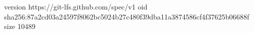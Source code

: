 version https://git-lfs.github.com/spec/v1
oid sha256:87a2cd03a24597f8062bc5024b27c480f39dba11a3874586cf4f37625b06688f
size 10489
